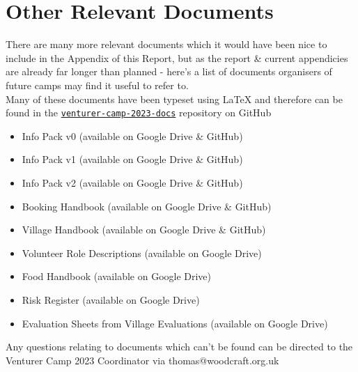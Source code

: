 \chapter{Other Relevant Documents}

There are many more relevant documents which it would have been nice to include in the Appendix of this Report, but as the report \& current appendicies are already far longer than planned - here's a list of documents organisers of future camps may find it useful to refer to.\\

Many of these documents have been typeset using \LaTeX{} and therefore can be found in the \href{https://github.com/wcfolk/venturer-camp-2023-docs}{\texttt{venturer-camp-2023-docs}} repository on GitHub
\begin{itemize}
    \item Info Pack v0 (available on Google Drive \& GitHub)
    \item Info Pack v1 (available on Google Drive \& GitHub)
    \item Info Pack v2 (available on Google Drive \& GitHub)
    \item Booking Handbook (available on Google Drive \& GitHub)
    \item Village Handbook (available on Google Drive \& GitHub)
    \item Volunteer Role Descriptions (available on Google Drive)
    \item Food Handbook (available on Google Drive)
    \item Risk Register (available on Google Drive)
    \item Evaluation Sheets from Village Evaluations (available on Google Drive)
\end{itemize}

Any questions relating to documents which can't be found can be directed to the Venturer Camp 2023 Coordinator via thomas@woodcraft.org.uk